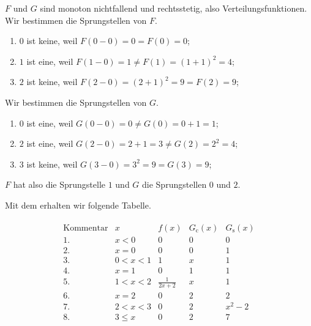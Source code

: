 \begin{solution}

$F$ und $G$ sind monoton nichtfallend und rechtsstetig, also Verteilungsfunktionen.
Wir bestimmen die Sprungstellen von $F$.

\begin{enumerate}
    \item $0$ ist keine, weil $F(0 - 0) = 0 = F(0) = 0$;
    \item $1$ ist eine,  weil $F(1 - 0) = 1 \neq F(1) = (1 + 1)^2 = 4$;
    \item $2$ ist keine, weil $F(2 - 0) = (2 + 1)^2 = 9 = F(2) = 9$;
\end{enumerate}

Wir bestimmen die Sprungstellen von $G$.

\begin{enumerate}
    \item $0$ ist eine,  weil $G(0 - 0) = 0 \neq G(0) = 0 + 1 = 1$;
    \item $2$ ist eine,  weil $G(2 - 0) = 2 + 1 = 3 \neq G(2) = 2^2 = 4$;
    \item $3$ ist keine, weil $G(3 - 0) = 3^2 = 9 = G(3) = 9$;
\end{enumerate}

$F$ hat also die Sprungstelle $1$ und $G$ die Sprungstellen $0$ und $2$.

Mit dem  erhalten wir folgende Tabelle.

\begin{align*}
    \begin{array}{c|c|c|c|c}
        \text{Kommentar}  & x         & f(x)              & G_\mathrm{c}(x) & G_\mathrm{s}(x) \\ \hline
        1.                & x < 0     & 0                 & 0               & 0               \\
        2.                & x = 0     & 0                 & 0               & 1               \\
        3.                & 0 < x < 1 & 1                 & x               & 1               \\
        4.                & x = 1     & 0                 & 1               & 1               \\
        5.                & 1 < x < 2 & \frac{1}{2 x + 2} & x               & 1               \\
        6.                & x = 2     & 0                 & 2               & 2               \\
        7.                & 2 < x < 3 & 0                 & 2               & x^2 - 2         \\
        8.                & 3 \leq x  & 0                 & 2               & 7
    \end{array}
\end{align*}


\end{solution}
